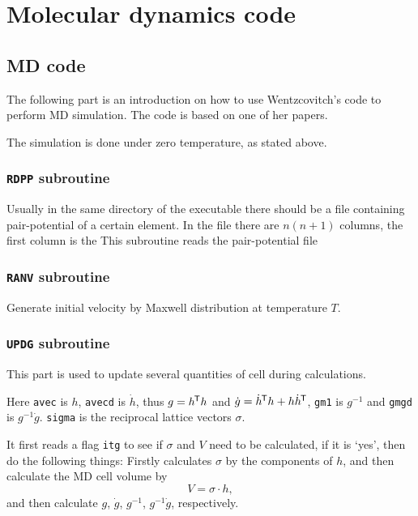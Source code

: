 
\section{Molecular dynamics code}

\subsection{MD code}

The following part is an introduction on how to use
Wentzcovitch's code to perform MD simulation. The code is
based on one of her papers.\cite{Wentzcovitch:1991ka}

The simulation is done under zero temperature, as stated above.


\subsubsection{\texttt{RDPP} subroutine}

Usually in the same directory of the executable there should be
a file containing pair-potential of a certain element. In the file there
are $n (n+1)$ columns, the first column is the
This subroutine reads the pair-potential file


\subsubsection{\texttt{RANV} subroutine}

Generate initial velocity by Maxwell distribution at temperature $T$.


\subsubsection{\texttt{UPDG} subroutine}

This part is used to update several quantities of cell during calculations.

Here \texttt{avec} is $h$, \texttt{avecd} is $\dot{ h }$, thus $g = h^{\mkern-1.5mu\mathsf{T}} h$
and $\dot{g}  = \dot{ h }^{\mkern-1.5mu\mathsf{T}} h + h \dot{ h }^{\mkern-1.5mu\mathsf{T}}$, \texttt{gm1} is $g^{-1}$
and \texttt{gmgd} is $g^{-1} \dot{g}$. \texttt{sigma} is the reciprocal lattice
vectors $\sigma$.

It first reads a flag \texttt{itg} to see if $\sigma$ and $V$ need to be calculated,
if it is `yes', then do the following things:
Firstly calculates $\sigma$ by the components of $h$, and then calculate the
MD cell volume by
\begin{equation}
	V = \sigma \cdot h,
\end{equation}
and then calculate $g$, $\dot{ g }$, $g^{-1}$, $g^{-1}\dot{g}$, respectively.


